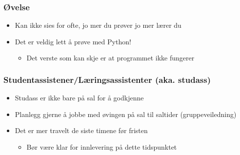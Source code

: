 \documentclass[screen, aspectratio=169]{beamer}
\begin{document}
\begin{frame}
	\frametitle{Øvelse}
	\begin{itemize}
		\item Kan ikke sies for ofte, jo mer du prøver jo mer lærer du
		\item Det er veldig lett å prøve med Python!
		\begin{itemize}
			\item Det verste som kan skje er at programmet ikke fungerer
		\end{itemize}
	\end{itemize}
\end{frame}

\begin{frame}
	\frametitle{Studentassistener/Læringsassistenter (aka. studass)}
	\begin{itemize}
		\item Studass er ikke bare på sal for å godkjenne
		\item Planlegg gjerne å jobbe med øvingen på sal til saltider (gruppeveiledning)
		\item Det er mer travelt de siste timene før fristen
		\begin{itemize}
			\item Bør være klar for innlevering på dette tidspunktet
		\end{itemize}
	\end{itemize}
\end{frame}
\end{document}
